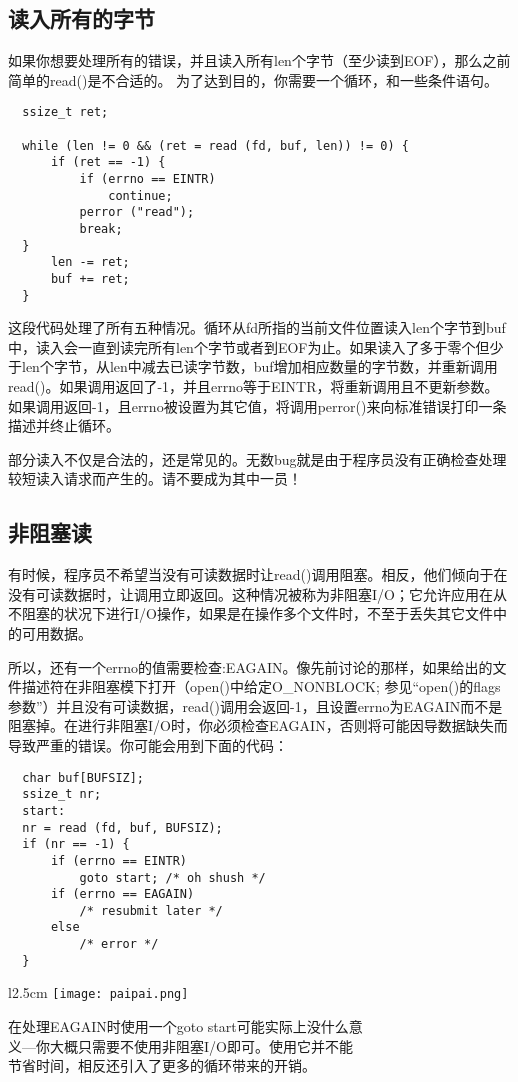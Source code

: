 \subsection{读入所有的字节}

如果你想要处理所有的错误，并且读入所有len个字节（至少读到EOF），那么之前简单的read()是不合适的。 为了达到目的，你需要一个循环，和一些条件语句。 

\begin{lstlisting}
  ssize_t ret;

  while (len != 0 && (ret = read (fd, buf, len)) != 0) {
      if (ret == -1) {
          if (errno == EINTR)
              continue;
          perror ("read");
          break;
  }
      len -= ret;
      buf += ret;
  }
\end{lstlisting}

这段代码处理了所有五种情况。循环从fd所指的当前文件位置读入len个字节到buf中，读入会一直到读完所有len个字节或者到EOF为止。如果读入了多于零个但少于len个字节，从len中减去已读字节数，buf增加相应数量的字节数，并重新调用read()。如果调用返回了-1，并且errno等于EINTR，将重新调用且不更新参数。如果调用返回-1，且errno被设置为其它值，将调用perror()来向标准错误打印一条描述并终止循环。

部分读入不仅是合法的，还是常见的。无数bug就是由于程序员没有正确检查处理较短读入请求而产生的。请不要成为其中一员！ 

\subsection{非阻塞读}

有时候，程序员不希望当没有可读数据时让read()调用阻塞。相反，他们倾向于在没有可读数据时，让调用立即返回。这种情况被称为非阻塞I/O；它允许应用在从不阻塞的状况下进行I/O操作，如果是在操作多个文件时，不至于丢失其它文件中的可用数据。

所以，还有一个errno的值需要检查:EAGAIN。像先前讨论的那样，如果给出的文件描述符在非阻塞模下打开（open()中给定O\_NONBLOCK; 参见“open()的flags参数”）并且没有可读数据，read()调用会返回-1，且设置errno为EAGAIN而不是阻塞掉。在进行非阻塞I/O时，你必须检查EAGAIN，否则将可能因导数据缺失而导致严重的错误。你可能会用到下面的代码： 

\begin{lstlisting}
  char buf[BUFSIZ];
  ssize_t nr;
  start:
  nr = read (fd, buf, BUFSIZ);
  if (nr == -1) {
      if (errno == EINTR)
          goto start; /* oh shush */
      if (errno == EAGAIN)
          /* resubmit later */
      else
          /* error */
  }
\end{lstlisting}
\par
\begin{wrapfigure}{l}{2.5cm}
\texttt{[image: paipai.png]}
\end{wrapfigure}
\mbox{}\begin{flushleft}在处理EAGAIN时使用一个goto start可能实际上没什么意\\义---你大概只需要不使用非阻塞I/O即可。使用它并不能\\节省时间，相反还引入了更多的循环带来的开销。\end{flushleft} 


